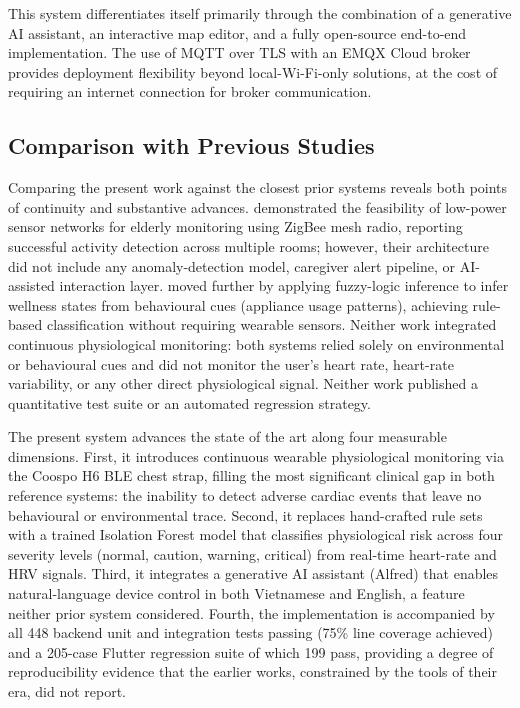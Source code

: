 This system differentiates itself primarily through the combination of a generative AI
assistant, an interactive map editor, and a fully open-source end-to-end
implementation. The use of MQTT over TLS with an EMQX Cloud broker provides
deployment flexibility beyond local-Wi-Fi-only solutions, at the cost of requiring an
internet connection for broker communication.

\subsection{Comparison with Previous Studies}

Comparing the present work against the closest prior systems reveals both points of
continuity and substantive advances. \textcite{Alam2012} demonstrated the feasibility
of low-power sensor networks for elderly monitoring using ZigBee mesh radio, reporting
successful activity detection across multiple rooms; however, their architecture did not
include any anomaly-detection model, caregiver alert pipeline, or AI-assisted
interaction layer. \textcite{Suryadevara2014} moved further by applying fuzzy-logic
inference to infer wellness states from behavioural cues (appliance usage patterns),
achieving rule-based classification without requiring wearable sensors. Neither work
integrated continuous physiological monitoring: both systems relied solely on
environmental or behavioural cues and did not monitor the user's heart rate, heart-rate
variability, or any other direct physiological signal. Neither work published a
quantitative test suite or an automated regression strategy.

The present system advances the state of the art along four measurable dimensions.
First, it introduces continuous wearable physiological monitoring via the Coospo H6 BLE
chest strap, filling the most significant clinical gap in both reference systems: the
inability to detect adverse cardiac events that leave no behavioural or environmental
trace. Second, it replaces hand-crafted rule sets with a trained Isolation Forest model
that classifies physiological risk across four severity levels (normal, caution,
warning, critical) from real-time heart-rate and HRV signals. Third, it integrates a
generative AI assistant (Alfred) that enables natural-language device control in both
Vietnamese and English, a feature neither prior system considered. Fourth, the
implementation is accompanied by all 448 backend unit and integration tests passing
(75\% line coverage achieved) and a 205-case Flutter regression suite of which 199 pass,
providing a degree of reproducibility evidence that the earlier works, constrained by
the tools of their era, did not report.

